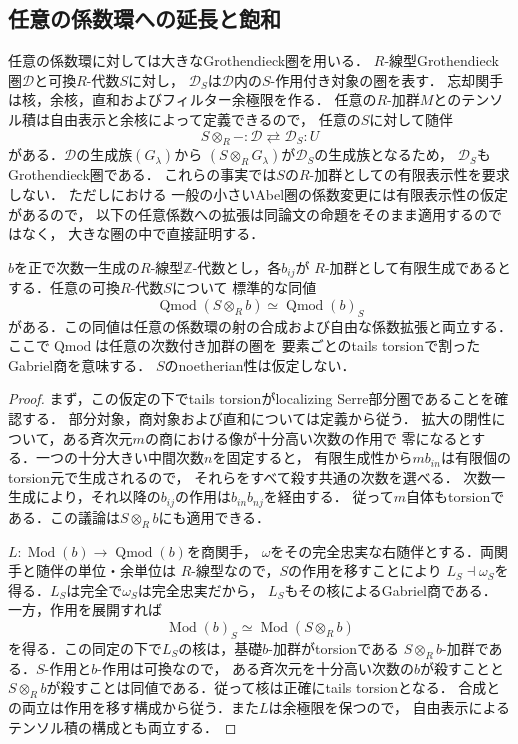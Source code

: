 \subsection{任意の係数環への延長と飽和}
\label{subsec:abel-universal-coefficients}

任意の係数環に対しては大きなGrothendieck圏を用いる．
$R$-線型Grothendieck圏$\mathcal D$と可換$R$-代数$S$に対し，
$\mathcal D_S$は$\mathcal D$内の$S$-作用付き対象の圏を表す．
忘却関手は核，余核，直和およびフィルター余極限を作る．
任意の$R$-加群$M$とのテンソル積は自由表示と余核によって定義できるので，
任意の$S$に対して随伴
\[
 S\otimes_R-:\mathcal D\rightleftarrows\mathcal D_S:U
\]
がある．$\mathcal D$の生成族$(G_\lambda)$から
$(S\otimes_R G_\lambda)$が$\mathcal D_S$の生成族となるため，
$\mathcal D_S$もGrothendieck圏である．
これらの事実では$S$の$R$-加群としての有限表示性を要求しない．
ただし\cite[\S4, pp.~5451--5454]{LowenVdBDeformation}における
一般の小さいAbel圏の係数変更には有限表示性の仮定があるので，
以下の任意係数への拡張は同論文の命題をそのまま適用するのではなく，
大きな圏の中で直接証明する．

\begin{lemma}[任意係数によるtails商の変更]
\label{lem:abel-arbitrary-coefficient-tails}
\label{lem:abel-artin-base-change}
$b$を正で次数一生成の$R$-線型$\mathbb Z$-代数とし，各$b_{ij}$が
$R$-加群として有限生成であるとする．任意の可換$R$-代数$S$について
標準的な同値
\[
 \operatorname{Qmod}(S\otimes_R b)
 \simeq \operatorname{Qmod}(b)_S
\]
がある．この同値は任意の係数環の射の合成および自由な係数拡張と両立する．
ここで$\operatorname{Qmod}$は任意の次数付き加群の圏を
要素ごとのtails torsionで割ったGabriel商を意味する．
$S$のnoetherian性は仮定しない．
\end{lemma}
\begin{proof}
まず，この仮定の下でtails torsionがlocalizing Serre部分圏であることを確認する．
部分対象，商対象および直和については定義から従う．
拡大の閉性について，ある斉次元$m$の商における像が十分高い次数の作用で
零になるとする．一つの十分大きい中間次数$n$を固定すると，
有限生成性から$m b_{in}$は有限個のtorsion元で生成されるので，
それらをすべて殺す共通の次数を選べる．
次数一生成により，それ以降の$b_{ij}$の作用は$b_{in}b_{nj}$を経由する．
従って$m$自体もtorsionである．この議論は$S\otimes_R b$にも適用できる．

$L:\operatorname{Mod}(b)\to\operatorname{Qmod}(b)$を商関手，
$\omega$をその完全忠実な右随伴とする．両関手と随伴の単位・余単位は
$R$-線型なので，$S$の作用を移すことにより
$L_S\dashv\omega_S$を得る．$L_S$は完全で$\omega_S$は完全忠実だから，
$L_S$もその核によるGabriel商である．
一方，作用を展開すれば
\[
 \operatorname{Mod}(b)_S\simeq\operatorname{Mod}(S\otimes_R b)
\]
を得る．この同定の下で$L_S$の核は，基礎$b$-加群がtorsionである
$S\otimes_R b$-加群である．$S$-作用と$b$-作用は可換なので，
ある斉次元を十分高い次数の$b$が殺すことと
$S\otimes_R b$が殺すことは同値である．従って核は正確にtails torsionとなる．
合成との両立は作用を移す構成から従う．また$L$は余極限を保つので，
自由表示によるテンソル積の構成とも両立する．
\end{proof}

